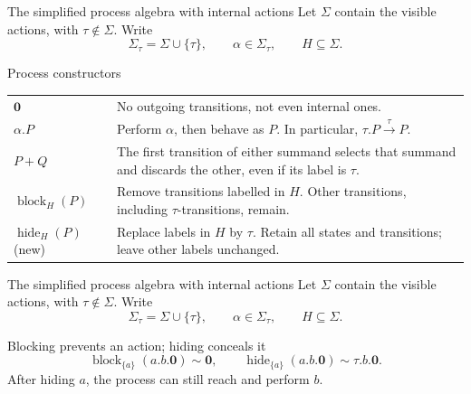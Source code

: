 \documentclass[handout,aspectratio=169,11pt]{beamer}
\newcommand{\step}[1]{\xrightarrow{#1}}
\newcommand{\nil}{\mathbf 0}
\newcommand{\blockact}[2]{\operatorname{block}_{#1}(#2)}
\newcommand{\hide}[2]{\operatorname{hide}_{#1}(#2)}
\begin{document}
\begin{frame}{The simplified process algebra with internal actions}
  Let $\Sigma$ contain the visible actions, with $\tau\notin\Sigma$.
  Write
  \[
    \Sigma_\tau=\Sigma\cup\{\tau\},
    \qquad \alpha\in\Sigma_\tau,
    \qquad H\subseteq\Sigma.
  \]

  \begin{block}{Process constructors}
    \renewcommand{\arraystretch}{1.4}
    \begin{tabular}{@{}p{}p{}@{}}
      $\nil$
        & No outgoing transitions, not even internal ones.\\
      $\alpha.P$
        & Perform $\alpha$, then behave as $P$.
          In particular, $\tau.P\step{\tau}P$.\\
      $P+Q$
        & The first transition of either summand selects that
          summand and discards the other, even if its label is $\tau$.\\
      $\blockact{H}{P}$
        & Remove transitions labelled in $H$.
          Other transitions, including $\tau$-transitions, remain.\\
      $\hide{H}{P}$ \alert{(new)}
        & Replace labels in $H$ by $\tau$.
          Retain all states and transitions; leave other labels unchanged.


        \end{tabular}
  \end{block}


\end{frame}


\begin{frame}{The simplified process algebra with internal actions}
  Let $\Sigma$ contain the visible actions, with $\tau\notin\Sigma$.
  Write
  \[
    \Sigma_\tau=\Sigma\cup\{\tau\},
    \qquad \alpha\in\Sigma_\tau,
    \qquad H\subseteq\Sigma.
  \]


  \begin{exampleblock}{Blocking prevents an action; hiding conceals it}
    \[
      \blockact{\{a\}}{a.b.\nil}\sim\nil,
      \qquad
      \hide{\{a\}}{a.b.\nil}\sim\tau.b.\nil.
    \]
    After hiding $a$, the process can still reach and perform $b$.
  \end{exampleblock}
\end{frame}
\end{document}
